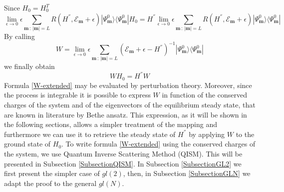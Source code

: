 \documentclass[10pt]{article}
\numberwithin{equation}{section}
\numberwithin{equation}{subsection}
\begin{document}
Since $H_{0}=H_{0}^{T}$ 
\begin{equation}
	\lim_{\epsilon\to 0}\epsilon\sum_{\bm{m}\,:\,|\bm{m}|=L}  R(H^{''},\mathcal{E}_{\bm{m}}+\epsilon)|\Psi_{\bm{m}}^{0}\rangle \langle \Psi_{\bm{m}}^{0}|H_{0}= H^{''}\lim_{\epsilon\to 0}\epsilon\sum_{\bm{m}\,:\,|\bm{m}|=L}  R(H^{''},\mathcal{E}_{\bm{m}}+\epsilon)|\Psi_{\bm{m}}^{0}\rangle \langle \Psi_{\bm{m}}^{0}|
\end{equation}
By calling 
\begin{equation}
	W= \lim_{\epsilon\to 0}\epsilon\sum_{\bm{m}\,:\,|\bm{m}|=L}  \left(\mathcal{E}_{\bm{m}}+\epsilon-H^{''}\right)^{-1}|\Psi_{\bm{m}}^{0}\rangle \langle \Psi_{\bm{m}}^{0}|
\end{equation}
we finally obtain 
\begin{equation}
	WH_{0}=H^{''}W
\end{equation}
Formula \eqref{W-extended} may be evaluated by perturbation theory. Moreover, since the process is integrable it is possible to express $W$ in function of the conserved charges of the system and of the eigenvectors of the equilibrium steady state, that are known in literature by Bethe ansatz. This expression, as it will be shown in the following sections, allows a simpler treatment of the mapping and furthermore we can use it to retrieve the steady state of $H^{''}$ by applying $W$ to the ground state of $H_{0}$. To write formula \eqref{W-extended} using the conserved charges of the system, we use Quantum Inverse Scattering Method (QISM). This will be presented in Subsection \ref{SubsectionQISM}. In Subsection \ref{SubsectionGL2} we first present the simpler case of $gl(2)$, then, in Subsection \ref{SubsectionGLN} we adapt the proof to the general $gl(N)$. 
\end{document}
